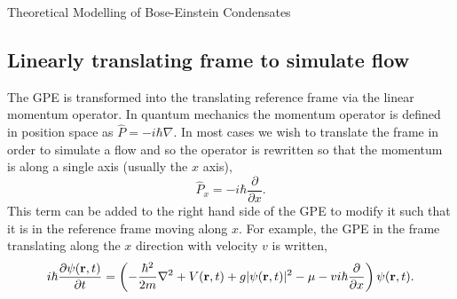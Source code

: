 \begin{chapter}{\label{cha:theoretical_model}Theoretical Modelling of Bose-Einstein Condensates}
	\subsection{\label{section:linearmovframe} Linearly translating frame to simulate flow}
	The GPE is transformed into the translating reference frame via the linear momentum operator. In quantum mechanics the momentum operator is defined in position space as $\hat{P} = -i\hbar\nabla$. In most cases we wish to translate the frame in order to simulate a flow and so the operator is rewritten so that the momentum is along a single axis (usually the $x$ axis),
	\begin{equation*}
	\hat{P}_x = -i\hbar\frac{\partial}{\partial x}.
	\end{equation*}
	This term can be added to the right hand side of the GPE to modify it such that it is in the reference frame moving along $x$. For example, the GPE in the frame translating along the $x$ direction with velocity $v$ is written,
	\begin{equation}\label{eq:linearframegpe}
	i\hbar \frac{\partial\psi({\bf r},t)}{\partial t} = \left(-\frac{\hbar^2}{2m}\nabla^2 + V({\bf r},t) + g|\psi({\bf r},t)|^2 - \mu -vi\hbar\frac{\partial}{\partial x} \right ) \psi({\bf r},t).
	\end{equation}


\end{chapter}
